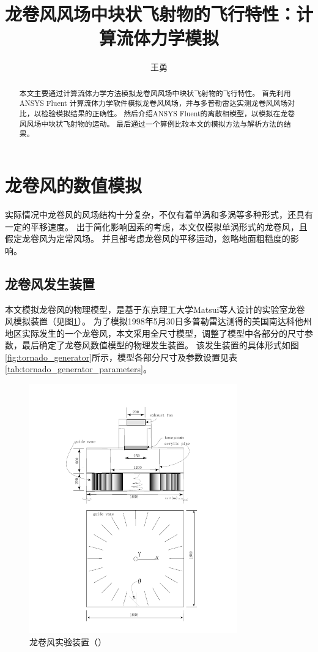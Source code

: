 \documentclass{ctexart}
\title{龙卷风风场中块状飞射物的飞行特性：计算流体力学模拟}
\author{王勇}
\begin{document}
\maketitle
\begin{abstract}
本文主要通过计算流体力学方法模拟龙卷风风场中块状飞射物的飞行特性。
首先利用ANSYS Fluent 计算流体力学软件模拟龙卷风风场，并与多普勒雷达实测龙卷风风场对比，以检验模拟结果的正确性。
然后介绍ANSYS Fluent的离散相模型，以模拟在龙卷风风场中块状飞射物的运动。
最后通过一个算例比较本文的模拟方法与解析方法的结果。
\end{abstract}

\section{龙卷风的数值模拟}
实际情况中龙卷风的风场结构十分复杂，不仅有着单涡和多涡等多种形式，还具有一定的平移速度。
出于简化影响因素的考虑，本文仅模拟单涡形式的龙卷风，且假定龙卷风为定常风场。
并且部考虑龙卷风的平移运动，忽略地面粗糙度的影响。

\subsection{龙卷风发生装置}
本文模拟龙卷风的物理模型，是基于东京理工大学Matsui等人\cite{matsui2009}设计的实验室龙卷风模拟装置（见图\ref{fig:matsui_tornado_generator}）。
为了模拟1998年5月30日多普勒雷达测得的美国南达科他州地区实际发生的一个龙卷风，本文采用全尺寸模型，调整了模型中各部分的尺寸参数，最后确定了龙卷风数值模型的物理发生装置\cite{tang2013}。
该发生装置的具体形式如图\ref{fig:tornado_generator}所示，模型各部分尺寸及参数设置见表\ref{tab:tornado_generator_parameters}。

\begin{figure}[h!]
\centering
\includegraphics[width=0.8\textwidth]{./fig/matsui_tornado_generator}
\caption{龙卷风实验装置（\cite{matsui2009}）}
\label{fig:matsui_tornado_generator}
\end{figure}
\end{document}

